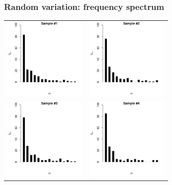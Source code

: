\documentclass[handout,notes=show,t]{beamer} %
\begin{document}
\begin{frame}
  \frametitle{Random variation: frequency spectrum}

  \ungap[1]
  \begin{center}
    \begin{tabular}{cc}
      \includegraphics[width=40mm]{img/02-samples-spc-1} &
      \includegraphics[width=40mm]{img/02-samples-spc-2} \\
      \includegraphics[width=40mm]{img/02-samples-spc-3} &
      \includegraphics[width=40mm]{img/02-samples-spc-4} 
    \end{tabular}
  \end{center}
\end{frame}
\end{document}
